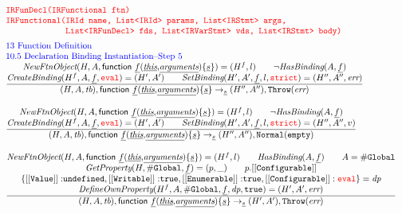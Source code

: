 \[
\begin{array}{l@{~~}l@{~~}ll}
\mtt{\normalsize\inred IRFunDecl(IRFunctional ftn)}\\
\mtt{\normalsize\inred IRFunctional(IRId name, List<IRId> params, List<IRStmt> args,}\\
\mtt{\normalsize\inred \phantom{IRFunctional(}List<IRFunDecl> fds, List<IRVarStmt> vds, List<IRStmt> body)}\\[.5em]

\mbox{\inblue 13 Function Definition}\\
\mbox{\inblue 10.5 Declaration Binding Instantiation--Step 5}\\
\frac{\begin{matrix}
\hf{NewFtnObject}(H,A,\irfndecl) = (H^f, l)
\rulesep
\neg\hf{HasBinding}(A, \ir{f})
\\
\hf{CreateBinding}(H^f, A, \ir{f}, \eval) = \resp
\rulesep
\hf{SetBinding}(H', A', \ir{f}, l, \strict) = (H'', A'', \err)
\end{matrix}}{\begin{matrix}
\state, \irfndecl \rightarrow_{\ir\stmt}
\respp, \error
\end{matrix}}\\[2em]

\frac{\begin{matrix}
\hf{NewFtnObject}(H,A,\irfndecl) = (H^f, l)
\rulesep
\neg\hf{HasBinding}(A, \ir{f})
\\
\hf{CreateBinding}(H^f, A, \ir{f}, \eval) = \resp
\rulesep
\hf{SetBinding}(H', A', \ir{f}, l, \strict) = (H'', A'', v)
\end{matrix}}{\begin{matrix}
\state, \irfndecl \rightarrow_{\ir\stmt} \respp, \void
\end{matrix}}\\[2em]

\frac{\begin{matrix}
\hf{NewFtnObject}(H,A,\irfndecl) = (H^f, l)
\rulesep
\hf{HasBinding}(A, \ir{f})
\rulesep A = \lg\\
\hf{GetProperty}(H,\lg,\ir{f}) = (p, \_)
\rulesep
p.{\tt[[Configurable]]}
\\
\{{\tt [[Value]]:}\undef, {\tt [[Writable]]:}\true, {\tt [[Enumerable]]:}\true, {\tt [[Configurable]]:\eval}\} = \emph{dp}
\\
\hf{DefineOwnProperty}(H^f,A,\lg,\ir{f}, \emph{dp}, \true) = (H',A',\err)\\
\end{matrix}}{\begin{matrix}
\state, \irfndecl \rightarrow_{\ir\stmt} \resp,\error
\end{matrix}}\\[2em]


\end{array}\]
